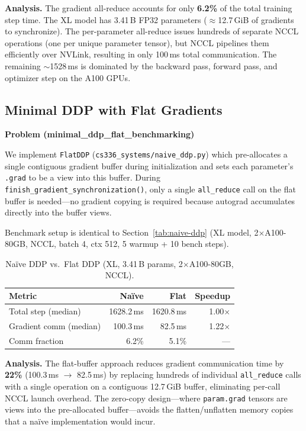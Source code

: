 \documentclass[11pt]{article}
\begin{document}
\textbf{Analysis.}
The gradient all-reduce accounts for only \textbf{6.2\%} of the total
training step time.  The XL model has 3.41\,B FP32 parameters
($\approx$12.7\,GiB of gradients to synchronize).
The per-parameter all-reduce issues hundreds of separate NCCL operations
(one per unique parameter tensor), but NCCL pipelines them efficiently over
NVLink, resulting in only 100\,ms total communication.
The remaining $\sim$1528\,ms is dominated by the backward pass,
forward pass, and optimizer step on the A100 GPUs.

\subsection{Minimal DDP with Flat Gradients}
\textbf{Problem (minimal\_ddp\_flat\_benchmarking)}

We implement \texttt{FlatDDP} (\texttt{cs336\_systems/naive\_ddp.py})
which pre-allocates a single contiguous gradient buffer during
initialization and sets each parameter's \texttt{.grad} to be a view
into this buffer.  During \texttt{finish\_gradient\_synchronization()},
only a single \texttt{all\_reduce} call on the flat buffer is needed---no
gradient copying is required because autograd accumulates directly into
the buffer views.

Benchmark setup is identical to Section~\ref{tab:naive-ddp}
(XL model, 2$\times$A100-80GB, NCCL, batch 4, ctx 512, 5 warmup + 10 bench steps).

\begin{table}[H]
\centering
\caption{Na\"ive DDP vs.\ Flat DDP (XL, 3.41\,B params, 2$\times$A100-80GB, NCCL).}
\label{tab:flat-ddp}
\begin{tabular}{l rr r}
  \toprule
  Metric & Na\"ive & Flat & Speedup \\
  \midrule
  Total step (median)    & 1628.2\,ms & 1620.8\,ms & 1.00$\times$ \\
  Gradient comm (median) &  100.3\,ms &   82.5\,ms & 1.22$\times$ \\
  Comm fraction          &    6.2\%   &    5.1\%   & --- \\
  \bottomrule
\end{tabular}
\end{table}

\textbf{Analysis.}
The flat-buffer approach reduces gradient communication time by
\textbf{22\%} (100.3\,ms $\to$ 82.5\,ms) by replacing hundreds of
individual \texttt{all\_reduce} calls with a single operation on a
contiguous 12.7\,GiB buffer, eliminating per-call NCCL launch overhead.
The zero-copy design---where \texttt{param.grad} tensors are views into
the pre-allocated buffer---avoids the flatten/unflatten memory copies
that a na\"ive implementation would incur.
\end{document}
